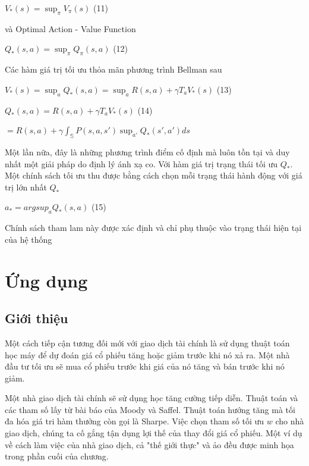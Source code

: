 \documentclass[14pt]{extreport}
\begin{document}
 \begin{center}
 $V_{*} (s)= \sup_{\pi} V_\pi (s)$  (11)
 \end{center}
 
 và Optimal Action - Value Function
 
 \begin{center}
 $Q_{*}(s,a)= \sup _\pi Q_\pi (s,a)$ (12)
 \end{center}
 
 Các hàm giá trị tối ưu thỏa mãn phương trình Bellman sau
 
 \begin{center}
 $V_* (s)= \sup _a Q_* (s,a)=\sup _a {R(s,a)+\gamma T_a V_* (s)}$ (13)
 
 $Q_*(s,a)=R(s,a)+\gamma T_a V_* (s)$ (14)
 
 $=R(s,a)+\gamma \int _{\mathbb{S}}P(s,a,s') \sup _{a'} Q_*(s',a')ds$
\end{center}

Một lần nữa, đây là những phương trình điểm cố định mà luôn tồn tại và duy nhất một giải pháp do định lý ánh xạ co. Với hàm giá trị trạng thái tối ưu $Q_*$. Một chính sách tối ưu thu được bằng cách chọn mỗi trạng thái hành động với giá trị lớn nhất $Q_*$

\begin{center}
$a_*= argsup _{a} Q_* (s,a)$ (15)
\end{center}

Chính sách tham lam này được xác định và chỉ phụ thuộc vào trạng thái hiện tại của hệ thống
\chapter{Ứng dụng}

\section{Giới thiệu}
Một cách tiếp cận tương đối mới với giao dịch tài chính là sử dụng thuật toán học máy để dự đoán giá cổ phiếu tăng hoặc giảm trước khi nó xả ra. Một nhà đầu tư tối ưu sẽ mua cổ phiếu trước khi giá của nó tăng và bán trước khi nó giảm.

Một nhà giao dịch tài chính sẽ sử dụng học tăng cường tiếp diễn. Thuật toán và các tham số lấy từ bài báo của Moody và Saffel. Thuật toán hướng tăng mà tối đa hóa giá tri hàm thưởng còn gọi là Sharpe. Việc chọn tham số tối ưu $w$ cho nhà giao dịch, chúng ta cố gắng tận dụng lợi thế của thay đổi giá cổ phiếu. Một ví dụ về cách làm việc của nhà giao dịch, cả "thế giới thực" và ảo đều được minh họa trong phần cuối của chương.
\end{document}
